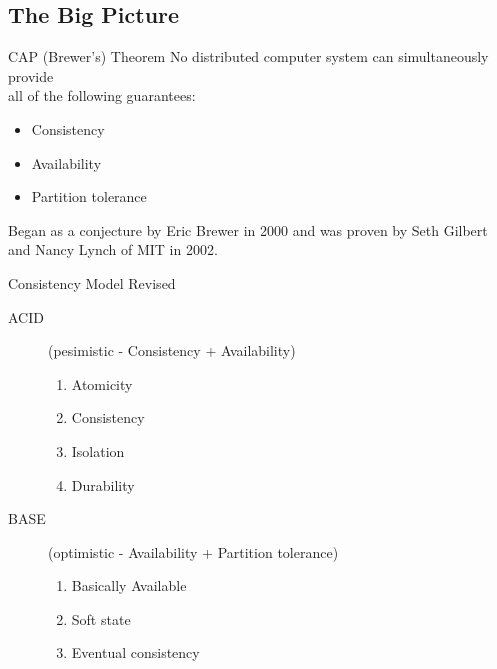\documentclass{beamer}
\begin{document}
\subsection{The Big Picture}
\begin{frame}{CAP (Brewer's) Theorem}
  No distributed computer system can simultaneously provide\\all of
  the following guarantees:
  \begin{itemize}
    \item Consistency
    \item Availability
    \item Partition tolerance
  \end{itemize}
  \begin{center}
  \end{center}
  \fontsize{6}{8}\selectfont
  Began as a conjecture by Eric Brewer in 2000 and was proven by Seth Gilbert
  and Nancy Lynch of MIT in 2002.\\
\end{frame}

\begin{frame}{Consistency Model Revised}
  \begin{description}
    \item[ACID] (pesimistic - Consistency + Availability) \hfill
    \begin{enumerate}
      \item Atomicity
      \item Consistency
      \item Isolation
      \item Durability
    \end{enumerate}
    \item[BASE] (optimistic - Availability + Partition tolerance) \hfill
    \begin{enumerate}
      \item Basically Available
      \item Soft state
      \item Eventual consistency
    \end{enumerate}
  \end{description} 
\end{frame}
\end{document}
